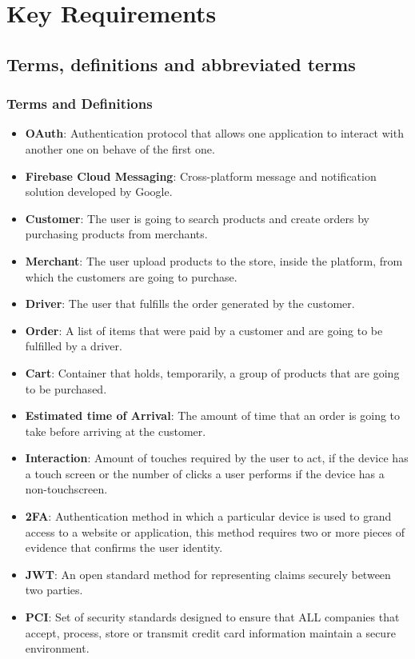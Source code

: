 \section{Key Requirements}
\subsection{Terms, definitions and abbreviated terms}
\subsubsection{Terms and Definitions}
\begin{itemize}
    \item \textbf{OAuth}: Authentication protocol that allows one application 
    to interact with another one on behave of the first one.
    \item \textbf{Firebase Cloud Messaging}: Cross-platform message and 
    notification solution developed by Google.
    \item \textbf{Customer}: The user is going to search products and create 
    orders by purchasing products from merchants.
    \item \textbf{Merchant}: The user upload products to the store, inside 
    the platform, from which the customers are going to purchase. 
    \item \textbf{Driver}: The user that fulfills the order generated by 
    the customer. 
    \item \textbf{Order}: A list of items that were paid by a customer and 
    are going to be fulfilled by a driver.
    \item \textbf{Cart}: Container that holds, temporarily, a group of 
    products that are going to be purchased.
    \item \textbf{Estimated time of Arrival}: The amount of time that an 
    order is going to take before arriving at the customer.
    \item \textbf{Interaction}: Amount of touches required by the user to 
    act, if the device has a touch screen or the number of clicks a user 
    performs if the device has a non-touchscreen.
    \item \textbf{2FA}: Authentication method in which a particular device is 
    used to grand access to a website or application, this method requires 
    two or more pieces of evidence that confirms the user identity.
    \item \textbf{JWT}: An open standard method for representing claims 
    securely between two parties.
    \item \textbf{PCI}: Set of security standards designed to ensure that 
    ALL companies that accept, process, store or transmit credit card 
    information maintain a secure environment. \cite{pci}
\end{itemize}
